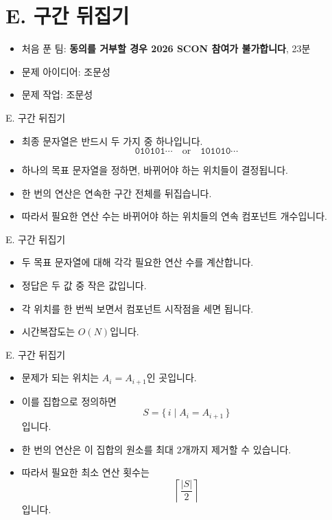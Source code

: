 \def\probno{E}
\def\probtitle{구간 뒤집기}

\section{\probno{}. \probtitle{}}

\begin{frame}
    \sectiontitle{\probno{}}{\probtitle{}}
    \begin{itemize}
        \item 처음 푼 팀: \textbf{동의를 거부할 경우 2026 SCON 참여가 불가합니다}, 23분
        \item 문제 아이디어: 조문성
        \item 문제 작업: 조문성
    \end{itemize}
\end{frame}

\begin{frame}{\probno{}. \probtitle{}}
    \begin{itemize}
        \item 최종 문자열은 반드시 두 가지 중 하나입니다.
        \[
            \texttt{010101}\cdots \quad \text{or} \quad \texttt{101010}\cdots
        \]
        \item 하나의 목표 문자열을 정하면, 바뀌어야 하는 위치들이 결정됩니다.
        \item 한 번의 연산은 연속한 구간 전체를 뒤집습니다.
        \item 따라서 필요한 연산 수는 바뀌어야 하는 위치들의 연속 컴포넌트 개수입니다.
    \end{itemize}
\end{frame}

\begin{frame}{\probno{}. \probtitle{}}
    \begin{itemize}
        \item 두 목표 문자열에 대해 각각 필요한 연산 수를 계산합니다.
        \item 정답은 두 값 중 작은 값입니다.
        \item 각 위치를 한 번씩 보면서 컴포넌트 시작점을 세면 됩니다.
        \item 시간복잡도는 $O(N)$입니다.
    \end{itemize}
\end{frame}

 \begin{frame}{\probno{}. \probtitle{}}
    \begin{itemize}
        \item 문제가 되는 위치는 $A_i = A_{i+1}$인 곳입니다.
        \item 이를 집합으로 정의하면
        \[
            S = \{\, i \mid A_i = A_{i+1} \,\}
        \]
        입니다.
        \item 한 번의 연산은 이 집합의 원소를 최대 $2$개까지 제거할 수 있습니다.
        \item 따라서 필요한 최소 연산 횟수는
        \[
            \left\lceil \frac{|S|}{2} \right\rceil
        \]
        입니다.
    \end{itemize}
\end{frame}